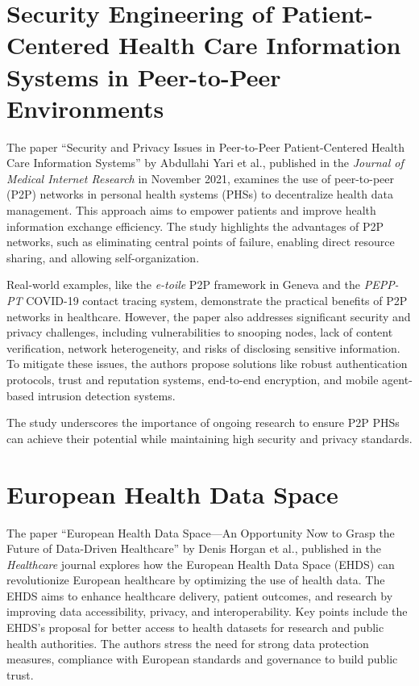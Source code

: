 \section{Security Engineering of Patient-Centered Health Care Information Systems in Peer-to-Peer Environments}\label{sec:security-engineering-of-patient-centered-health-care-information-systems-in-peer-to-peer-environments}

The paper ``Security and Privacy Issues in Peer-to-Peer Patient-Centered Health Care Information Systems'' by Abdullahi Yari et al., published in the \textit{Journal of Medical Internet Research} in November 2021, examines the use of peer-to-peer (P2P) networks in personal health systems (PHSs) to decentralize health data management\cite{security_engineering_p2p_environments}.
This approach aims to empower patients and improve health information exchange efficiency.
The study highlights the advantages of P2P networks, such as eliminating central points of failure, enabling direct resource sharing, and allowing self-organization.

Real-world examples, like the \textit{e-toile} P2P framework in Geneva and the \textit{PEPP-PT} COVID-19 contact tracing system, demonstrate the practical benefits of P2P networks in healthcare.
However, the paper also addresses significant security and privacy challenges, including vulnerabilities to snooping nodes, lack of content verification, network heterogeneity, and risks of disclosing sensitive information.
To mitigate these issues, the authors propose solutions like robust authentication protocols, trust and reputation systems, end-to-end encryption, and mobile agent-based intrusion detection systems.%

The study underscores the importance of ongoing research to ensure P2P PHSs can achieve their potential while maintaining high security and privacy standards.

\section{European Health Data Space}\label{sec:european-health-data-spac}

The paper ``European Health Data Space—An Opportunity Now to Grasp the Future of Data-Driven Healthcare'' by Denis Horgan et al., published in the \textit{Healthcare} journal explores how the European Health Data Space (EHDS) can revolutionize European healthcare by optimizing the use of health data\cite{european_health_data_space}.
The EHDS aims to enhance healthcare delivery, patient outcomes, and research by improving data accessibility, privacy, and interoperability.
Key points include the EHDS's proposal for better access to health datasets for research and public health authorities.
The authors stress the need for strong data protection measures, compliance with European standards and governance to build public trust.

